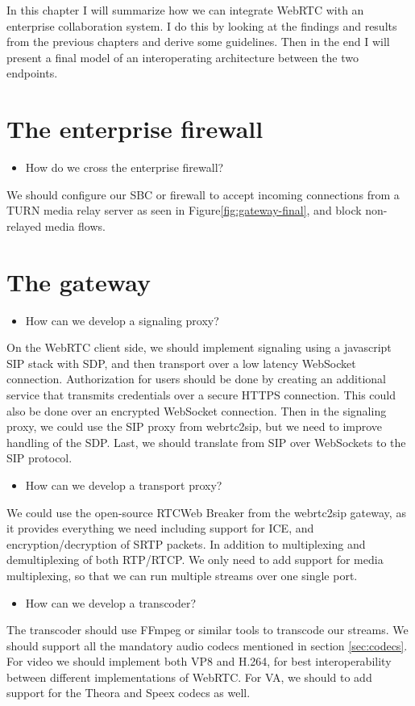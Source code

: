 In this chapter I will summarize how we can integrate WebRTC with an enterprise collaboration system. I do this by looking at the findings and results from the previous chapters and derive some guidelines. Then in the end I will present a final model of an interoperating architecture between the two endpoints.

\section{The enterprise firewall}

\begin{itemize}
\item How do we cross the enterprise firewall?
\end{itemize}
We should configure our SBC or firewall to accept incoming connections from a TURN media relay server as seen in Figure\ref{fig:gateway-final}, and block non-relayed media flows.

\section{The gateway}

\begin{itemize}
\item How can we develop a signaling proxy?
\end{itemize}
On the WebRTC client side, we should implement signaling using a javascript SIP stack with SDP, and then transport over a low latency WebSocket connection. Authorization for users should be done by creating an additional service that transmits credentials over a secure HTTPS connection. This could also be done over an encrypted WebSocket connection. Then in the signaling proxy, we could use the SIP proxy from webrtc2sip, but we need to improve handling of the SDP. Last, we should translate from SIP over WebSockets to the SIP protocol.

\begin{itemize}
\item How can we develop a transport proxy?
\end{itemize}
We could use the open-source RTCWeb Breaker from the webrtc2sip gateway, as it provides everything we need including support for ICE, and encryption/decryption of SRTP packets. In addition to multiplexing and demultiplexing of both RTP/RTCP. We only need to add support for media multiplexing, so that we can run multiple streams over one single port.

\begin{itemize}
\item How can we develop a transcoder?
\end{itemize}
The transcoder should use FFmpeg or similar tools to transcode our streams. We should support all the mandatory audio codecs mentioned in section \ref{sec:codecs}. For video we should implement both VP8 and H.264, for best interoperability between different implementations of WebRTC. For VA, we should to add support for the Theora and Speex codecs as well.

